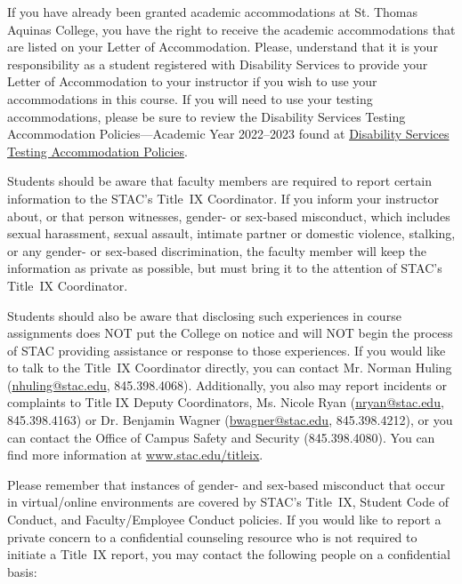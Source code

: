 \documentclass[11pt,letterpaper]{article}
\begin{document}
If you have already been granted academic accommodations at St. Thomas Aquinas College, you have the right to receive the academic accommodations that are listed on your Letter of Accommodation. Please, understand that it is your responsibility as a student registered with Disability Services to provide your Letter of Accommodation to your instructor if you wish to use your accommodations in this course. If you will need to use your testing accommodations, please be sure to review the Disability Services Testing Accommodation Policies---Academic Year 2022--2023 found at \href{https://docs.google.com/document/d/1V5iUtgypiS8kClqhSLPde7AOSZPoLu6CsIDcpiEic2w/edit}{Disability Services Testing Accommodation Policies}. \sectionbreak





\newpage






Students should be aware that faculty members are required to report certain information to the STAC’s Title~IX Coordinator. If you inform your instructor about, or that person witnesses, gender- or sex-based misconduct, which includes sexual harassment, sexual assault, intimate partner or domestic violence, stalking, or any gender- or sex-based discrimination, the faculty member will keep the information as private as possible, but must bring it to the attention of STAC’s Title~IX Coordinator. \pspace

Students should also be aware that disclosing such experiences in course assignments does NOT put the College on notice and will NOT begin the process of STAC providing assistance or response to those experiences. If you would like to talk to the Title~IX Coordinator directly, you can contact Mr. Norman Huling (\href{mailto:nhuling@stac.edu}{nhuling@stac.edu}, 845.398.4068). Additionally, you also may report incidents or complaints to Title IX Deputy Coordinators, Ms. Nicole Ryan (\href{mailto:nryan@stac.edu}{nryan@stac.edu}, 845.398.4163) or Dr. Benjamin Wagner (\href{mailto:bwagner@stac.edu}{bwagner@stac.edu}, 845.398.4212), or you can contact the Office of Campus Safety and Security (845.398.4080). You can find more information at \url{www.stac.edu/titleix}. \pspace

Please remember that instances of gender- and sex-based misconduct that occur in virtual/online environments are covered by STAC’s Title~IX, Student Code of Conduct, and Faculty/Employee Conduct policies. If you would like to report a private concern to a confidential counseling resource who is not required to initiate a Title~IX report, you may contact the following people on a confidential basis: \pspace
\end{document}
